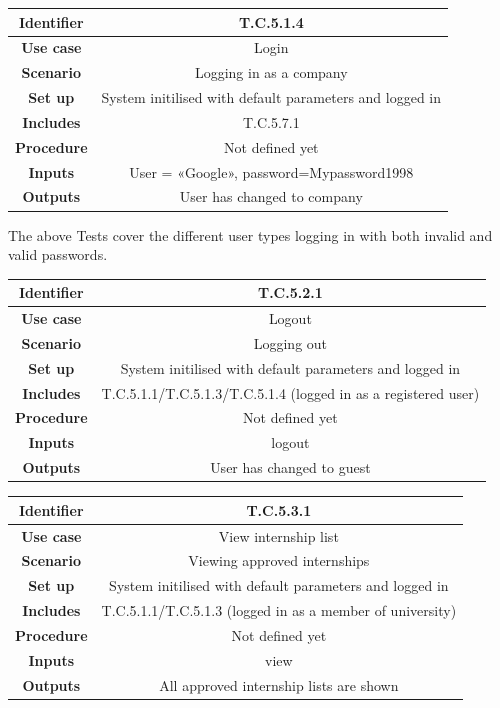 \documentclass{l3deliverable}
\begin{document}
\begin{tabular}{|c|c|}
\hline \textbf{Identifier} & T.C.5.1.4 \\
\hline \textbf{Use case} & Login \\
\hline \textbf{Scenario} & Logging in as a company\\
\hline \textbf{Set up} & System initilised with default parameters and logged in\\
\hline \textbf{Includes} & T.C.5.7.1\\
\hline \textbf{Procedure} & Not defined yet\\
\hline \textbf{Inputs} & User = «Google», password=Mypassword1998\\
\hline \textbf{Outputs} & User has changed to company\\
\hline
\end{tabular}

The above Tests cover the different user types logging in with both
invalid and valid passwords.\\ 

\begin{tabular}{|c|c|}
\hline \textbf{Identifier} & T.C.5.2.1 \\
\hline \textbf{Use case} & Logout \\
\hline \textbf{Scenario} & Logging out\\
\hline \textbf{Set up} & System initilised with default parameters and logged in\\
\hline \textbf{Includes} & T.C.5.1.1/T.C.5.1.3/T.C.5.1.4 (logged in as a registered user)\\
\hline \textbf{Procedure} & Not defined yet\\
\hline \textbf{Inputs} & logout\\
\hline \textbf{Outputs} & User has changed to guest\\
\hline
\end{tabular}

\begin{tabular}{|c|c|}
\hline \textbf{Identifier} & T.C.5.3.1 \\
\hline \textbf{Use case} & View internship list\\
\hline \textbf{Scenario} & Viewing approved internships\\
\hline \textbf{Set up} & System initilised with default parameters and logged in\\
\hline \textbf{Includes} & T.C.5.1.1/T.C.5.1.3 (logged in as a member of university)\\
\hline \textbf{Procedure} & Not defined yet\\
\hline \textbf{Inputs} & view\\
\hline \textbf{Outputs} & All approved internship lists are shown\\
\hline
\end{tabular}
\end{document}
